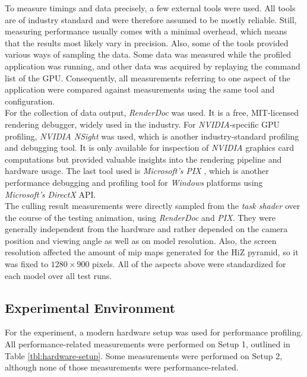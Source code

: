 To measure timings and data precisely, a few external tools were used. All tools are of industry standard 
and were therefore assumed to be mostly reliable. Still, measuring performance usually comes with a minimal 
overhead, which means that the results most likely vary in precision. Also, some of the tools provided 
various ways of sampling the data. Some data was measured while the profiled application was running, and 
other data was acquired by replaying the command list of the \ac{GPU}. Consequently, all measurements 
referring to one aspect of the application were compared against measurements using the same tool and 
configuration. \\

\noindent
For the collection of data output, \emph{RenderDoc} \cite{RenderDoc} was used. It is a free, MIT-licensed 
rendering debugger, widely used in the industry. For \emph{NVIDIA}-specific \ac{GPU} profiling, \emph{NVIDIA NSight} 
\cite{NSight} was used, which is another industry-standard profiling and debugging tool. It is only available for 
inspection of \emph{NVIDIA} graphics card computations but provided valuable insights into the rendering pipeline 
and hardware usage. The last tool used is \emph{Microsoft's PIX} \cite{PIX}, which is another performance debugging 
and profiling tool for \emph{Windows} platforms using \emph{Microsoft's DirectX} \ac{API}. \\

\noindent
The culling result measurements were directly sampled from the \emph{task shader} over the course of the testing 
animation, using \emph{RenderDoc} and \emph{PIX}. They were generally independent from the hardware and rather 
depended on the camera position and viewing angle as well as on model resolution. Also, the screen resolution 
affected the amount of mip maps generated for the \ac{HiZ} pyramid, so it was fixed to $1280 \times 900$ pixels. 
All of the aspects above were standardized for each model over all test runs.


\subsection*{Experimental Environment} \label{subsec-experimental-environment}

For the experiment, a modern hardware setup was used for performance profiling. All performance-related 
measurements were performed on Setup 1, outlined in Table \ref{tbl:hardware-setup}. Some measurements 
were performed on Setup 2, although none of those measurements were performance-related.


